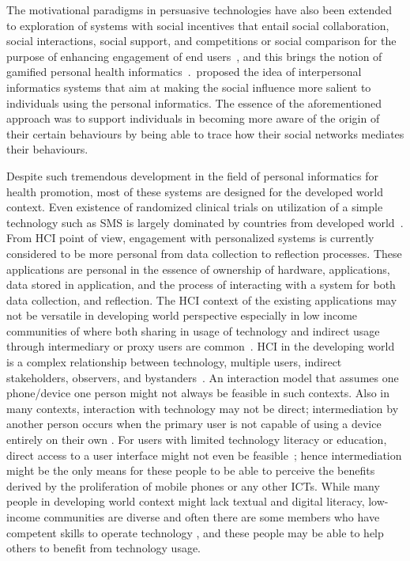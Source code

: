 The motivational paradigms in persuasive technologies have also been extended to exploration of systems with social incentives that entail social collaboration, social interactions, social support, and competitions or social comparison for the purpose of enhancing engagement of end users~\citep{ploderer2014social,chen2016social,epstein2015nobody,reno2016matters}, and this brings the notion of gamified personal health informatics~\citep{lin2006:fish,chen2014healthytogether,han2014designing}.~\citep{bales2011interpersonal}proposed the idea of interpersonal informatics systems that aim at making the social influence more salient to individuals using the personal informatics. The essence of the aforementioned approach was to support individuals in becoming more aware of the origin of their certain behaviours by being able to trace how their social networks mediates their behaviours.

Despite such tremendous development in the field of personal informatics for health promotion, most of these systems are designed for the developed world context. Even existence of randomized clinical trials on utilization of a simple technology such as SMS is largely dominated by countries from developed world~\citep{cole2010text}. From HCI point of view, engagement with personalized systems is currently considered to be more personal from data collection to reflection processes. These applications are personal in the essence of ownership of hardware, applications, data stored in application, and the process of interacting with a system for both data collection, and reflection. The HCI context of the existing applications may not be versatile in developing world perspective especially in low income communities of where  both sharing in usage of technology and indirect usage through intermediary or proxy users are common~\citep{kaplan2006can,sambasivan2010}. HCI in the developing world is a complex relationship between technology, multiple users, indirect stakeholders, observers, and bystanders~\citep{parikh2006}. An interaction model that assumes one phone/device one person might not always be feasible in such contexts. Also in many contexts, interaction with technology may not be direct; intermediation by another person occurs when the primary user is not capable of using a device entirely on their own \citep{sambasivan2010}. For users with limited technology literacy or education, direct access to a user interface might not even be feasible~\citep{parikh2006}; hence intermediation might be the only means for these people to be able to perceive the benefits derived by the proliferation of mobile phones or any other ICTs. While many people in developing world context might lack textual and digital literacy, low-income communities are diverse and often there are some members who have competent skills to operate technology \citep{sambasivan2010}, and these people may be able to help others to benefit from technology usage.

